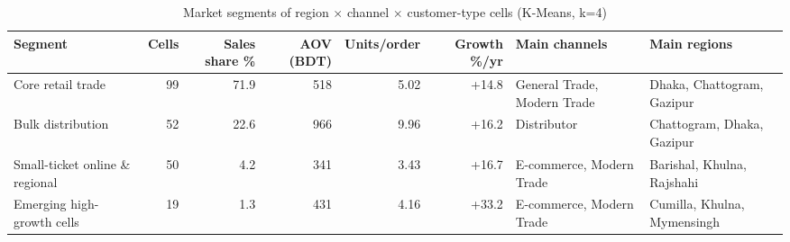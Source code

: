 \begin{table}[htbp]
\centering
\scriptsize
\caption{Market segments of region $\times$ channel $\times$ customer-type cells (K-Means, k=4)}
\label{tab:marketclusters}
\begin{adjustbox}{max width=\linewidth}
\begin{tabular}{lrrrrrll}
\toprule
\textbf{Segment} & \textbf{Cells} & \textbf{Sales share \%} & \textbf{AOV (BDT)} & \textbf{Units/order} & \textbf{Growth \%/yr} & \textbf{Main channels} & \textbf{Main regions} \\
\midrule
Core retail trade & 99 & 71.9 & 518 & 5.02 & +14.8 & General Trade, Modern Trade & Dhaka, Chattogram, Gazipur \\
Bulk distribution & 52 & 22.6 & 966 & 9.96 & +16.2 & Distributor & Chattogram, Dhaka, Gazipur \\
Small-ticket online \& regional & 50 & 4.2 & 341 & 3.43 & +16.7 & E-commerce, Modern Trade & Barishal, Khulna, Rajshahi \\
Emerging high-growth cells & 19 & 1.3 & 431 & 4.16 & +33.2 & E-commerce, Modern Trade & Cumilla, Khulna, Mymensingh \\
\bottomrule
\end{tabular}
\end{adjustbox}
\end{table}